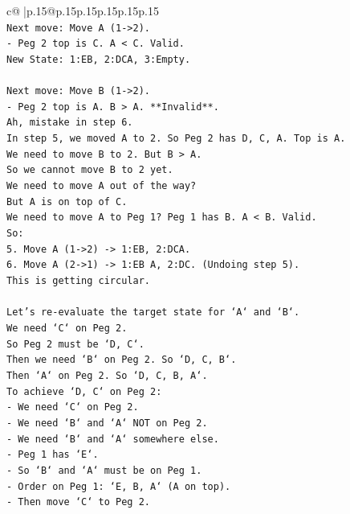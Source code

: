 \documentclass{article}
\begin{document}
{\begin{supertabular}{c@{$\;$}|p{.15\linewidth}@{}p{.15\linewidth}p{.15\linewidth}p{.15\linewidth}p{.15\linewidth}p{.15\linewidth}}
{{{\\ 
\texttt{Next move: Move A (1{-}>2).} \\
\texttt{{-} Peg 2 top is C. A < C. Valid.} \\
\texttt{New State: 1:EB, 2:DCA, 3:Empty.} \\
\\ 
\texttt{Next move: Move B (1{-}>2).} \\
\texttt{{-} Peg 2 top is A. B > A. **Invalid**.} \\
\texttt{Ah, mistake in step 6.} \\
\texttt{In step 5, we moved A to 2. So Peg 2 has D, C, A. Top is A.} \\
\texttt{We need to move B to 2. But B > A.} \\
\texttt{So we cannot move B to 2 yet.} \\
\texttt{We need to move A out of the way?} \\
\texttt{But A is on top of C.} \\
\texttt{We need to move A to Peg 1? Peg 1 has B. A < B. Valid.} \\
\texttt{So:} \\
\texttt{5. Move A (1{-}>2) {-}> 1:EB, 2:DCA.} \\
\texttt{6. Move A (2{-}>1) {-}> 1:EB A, 2:DC. (Undoing step 5).} \\
\texttt{This is getting circular.} \\
\\ 
\texttt{Let's re{-}evaluate the target state for `A` and `B`.} \\
\texttt{We need `C` on Peg 2.} \\
\texttt{So Peg 2 must be `D, C`.} \\
\texttt{Then we need `B` on Peg 2. So `D, C, B`.} \\
\texttt{Then `A` on Peg 2. So `D, C, B, A`.} \\
\texttt{To achieve `D, C` on Peg 2:} \\
\texttt{{-} We need `C` on Peg 2.} \\
\texttt{{-} We need `B` and `A` NOT on Peg 2.} \\
\texttt{{-} We need `B` and `A` somewhere else.} \\
\texttt{{-} Peg 1 has `E`.} \\
\texttt{{-} So `B` and `A` must be on Peg 1.} \\
\texttt{{-} Order on Peg 1: `E, B, A` (A on top).} \\
\texttt{{-} Then move `C` to Peg 2.} \\
}}}
\end{supertabular}}
\end{document}
